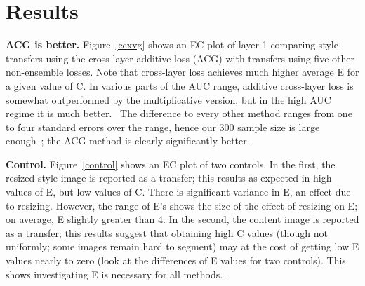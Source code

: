\documentclass[runningheads]{llncs}
\begin{document}

\section{Results\label{results}}
%


{\bf ACG is better.} Figure~\ref{ecxvg} shows an EC plot of layer 1 comparing style transfers using the cross-layer additive loss (ACG) with transfers using five other non-ensemble losses. Note that cross-layer loss achieves much higher average E for a given value of C.  In various parts of the AUC range, additive cross-layer loss is somewhat outperformed by the multiplicative version, but in the high AUC regime it is much better.  \
The difference to every other method ranges from one to four standard errors over the range, hence our 300 sample size is large enough~\cite{Forsyth2018}; the ACG method is clearly significantly better.

{\bf Control.}  Figure~\ref{control} shows an EC plot of two controls.  In the first, the resized style image is reported as a transfer; this results as expected in high values of E, but low values of C. There is significant variance in E, an effect due to resizing.  However, the range of E's shows the size of the effect of resizing on E; on average, E slightly greater than 4.  In the second, the content image is reported as a transfer; this results  suggest that obtaining high C values (though not uniformly; some images remain hard to segment)  may at the cost of getting low E values nearly to zero (look at the differences of E values for two controls). This shows investigating E is necessary for all methods. .  
\end{document}
